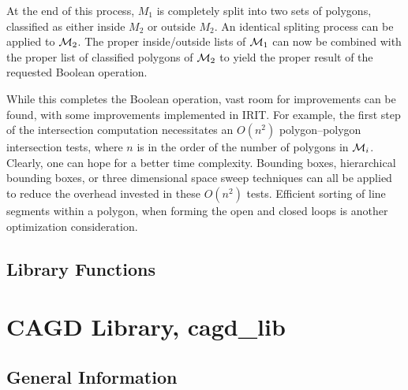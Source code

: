 At the end of this process, $M_1$ is completely split into two sets of
polygons, classified as either inside $M_2$ or outside $M_2$.  An
identical spliting process can be applied to ${\cal M}_2$.  The proper
inside/outside lists of ${\cal M}_1$ can now be combined with the
proper list of classified polygons of ${\cal M}_2$ to yield the proper
result of the requested Boolean operation.

While this completes the Boolean operation, vast room for improvements
can be found, with some improvements implemented in IRIT.  For
example, the first step of the intersection computation necessitates
an $O(n^2)$ polygon--polygon intersection tests, where $n$ is in the
order of the number of polygons in ${\cal M}_i$.  Clearly, one can
hope for a better time complexity.  Bounding boxes, hierarchical
bounding boxes, or three dimensional space sweep techniques can all be
applied to reduce the overhead invested in these $O(n^2)$ tests.
Efficient sorting of line segments within a polygon, when forming the
open and closed loops is another optimization consideration.

\section{Library Functions}


\chapter{CAGD Library, cagd\_lib}

\section{General Information}

